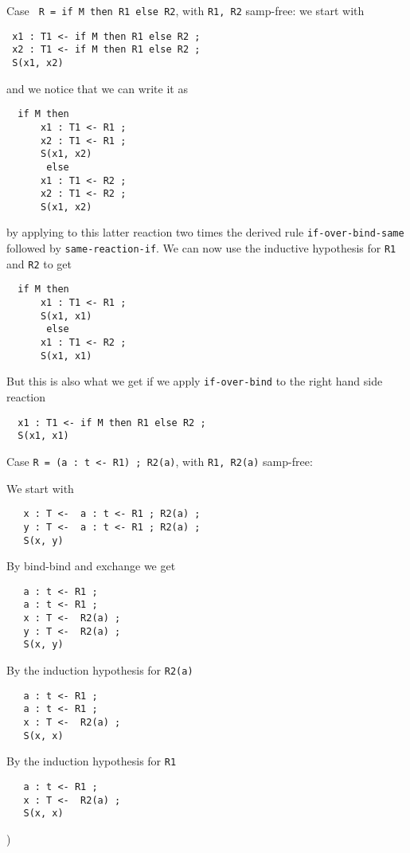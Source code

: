 \documentclass{article}
\begin{document}
\begin{itemize}
 Case \verb+ R = if M then R1 else R2+, with \verb+R1, R2+ samp-free:
 we start with 
   \begin{lstlisting}
 x1 : T1 <- if M then R1 else R2 ; 
 x2 : T1 <- if M then R1 else R2 ; 
 S(x1, x2)
 \end{lstlisting} 
 and we notice that we can write it as
   \begin{lstlisting}
  if M then 
      x1 : T1 <- R1 ;
      x2 : T1 <- R1 ; 
      S(x1, x2)  
       else
      x1 : T1 <- R2 ;
      x2 : T1 <- R2 ; 
      S(x1, x2) 
 \end{lstlisting}
 by applying to this latter reaction two times the derived rule 
 \verb+if-over-bind-same+ followed by \verb+same-reaction-if+.
 We can now use the inductive hypothesis for \verb+R1+ and \verb+R2+ to get
   \begin{lstlisting}
  if M then 
      x1 : T1 <- R1 ;
      S(x1, x1)  
       else
      x1 : T1 <- R2 ; 
      S(x1, x1) 
 \end{lstlisting}
 But this is also what we get if we apply \verb+if-over-bind+ to
 the right hand side reaction
    \begin{lstlisting}
  x1 : T1 <- if M then R1 else R2 ;
  S(x1, x1)  
   \end{lstlisting}

 
 Case \verb+R = (a : t <- R1) ; R2(a)+, with \verb+R1, R2(a)+ samp-free:
 

We start with
  \begin{lstlisting}
   x : T <-  a : t <- R1 ; R2(a) ;
   y : T <-  a : t <- R1 ; R2(a) ;
   S(x, y)
  \end{lstlisting}

By bind-bind and exchange we get

  \begin{lstlisting}
   a : t <- R1 ; 
   a : t <- R1 ; 
   x : T <-  R2(a) ;
   y : T <-  R2(a) ;
   S(x, y)
  \end{lstlisting}

By the induction hypothesis for \verb+R2(a)+

  \begin{lstlisting}
   a : t <- R1 ; 
   a : t <- R1 ; 
   x : T <-  R2(a) ;
   S(x, x)
  \end{lstlisting}
  
By the induction hypothesis for \verb+R1+

 \begin{lstlisting}
   a : t <- R1 ; 
   x : T <-  R2(a) ;
   S(x, x)
  \end{lstlisting})


\end{itemize}
\end{document}
